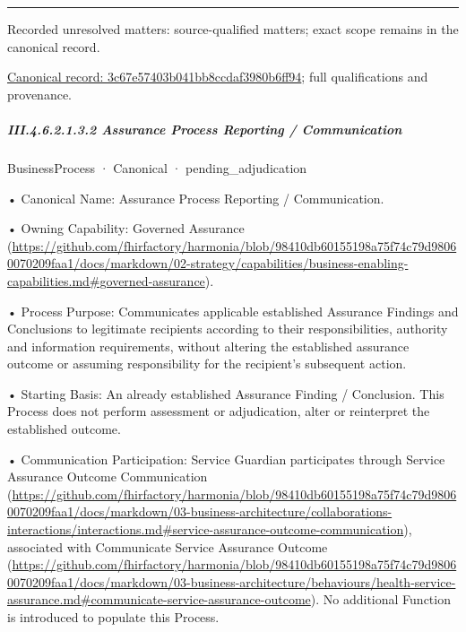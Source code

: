 \medskip\hrule\medskip

{\small Recorded unresolved matters: source-qualified matters; exact scope remains in the canonical record.}\par
{\footnotesize \href{../../../../../../../continuum/business/business-process/3c67e57403b041bb8ccdaf3980b6ff94.md}{Canonical record: 3c67e57403b041bb8ccdaf3980b6ff94}; full qualifications and provenance.}\par
\subparagraph*{III.4.6.2.1.3.2 Assurance Process Reporting / Communication}
\label{navigation:III.4.6.2.1.3.2}

\label{element:2fc0b626577b43feb050bcd91ac2b0a9}
{\small BusinessProcess · Canonical · pending\_adjudication}\par

•
Canonical Name: Assurance Process Reporting / Communication.



•
Owning Capability: Governed Assurance (\url{https://github.com/fhirfactory/harmonia/blob/98410db60155198a75f74c79d98060070209faa1/docs/markdown/02-strategy/capabilities/business-enabling-capabilities.md#governed-assurance}).



•
Process Purpose: Communicates applicable established Assurance Findings and Conclusions to legitimate recipients according to their responsibilities, authority and information requirements, without altering the established assurance outcome or assuming responsibility for the recipient's subsequent action.



•
Starting Basis: An already established Assurance Finding / Conclusion. This Process does not perform assessment or adjudication, alter or reinterpret the established outcome.



•
Communication Participation: Service Guardian participates through Service Assurance Outcome Communication (\url{https://github.com/fhirfactory/harmonia/blob/98410db60155198a75f74c79d98060070209faa1/docs/markdown/03-business-architecture/collaborations-interactions/interactions.md#service-assurance-outcome-communication}), associated with Communicate Service Assurance Outcome (\url{https://github.com/fhirfactory/harmonia/blob/98410db60155198a75f74c79d98060070209faa1/docs/markdown/03-business-architecture/behaviours/health-service-assurance.md#communicate-service-assurance-outcome}). No additional Function is introduced to populate this Process.




